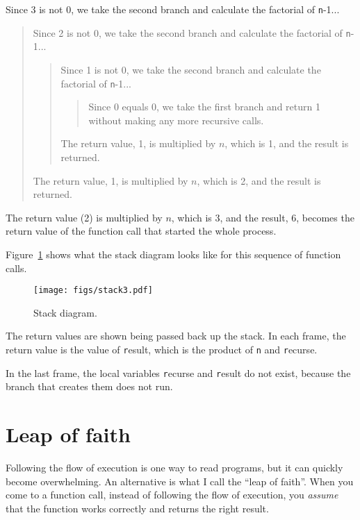\documentclass[
DIV=11,
fontsize=12,
twoside,
headinclude=false,
titlepage=firstiscover,
abstract=true,
headsepline=true,
footsepline=true,
chapterprefix=true, %
headings=big,
bibliography=totoc,%
captions=tableheading
]{scrbook}
\theoremstyle{definition}
\begin{document}
Since 3 is not 0, we take the second branch and calculate the factorial
of {\texttt n-1}...

\begin{quote}
Since 2 is not 0, we take the second branch and calculate the factorial of
{\texttt n-1}...


  \begin{quote}
  Since 1 is not 0, we take the second branch and calculate the factorial
  of {\texttt n-1}...


    \begin{quote}
    Since 0 equals 0, we take the first branch and return 1
    without making any more recursive calls.
    \end{quote}


  The return value, 1, is multiplied by $n$, which is 1, and the
  result is returned.
  \end{quote}


The return value, 1, is multiplied by $n$, which is 2, and the
result is returned.
\end{quote}


The return value (2) is multiplied by $n$, which is 3, and the result, 6,
becomes the return value of the function call that started the whole
process.

Figure~\ref{fig.stack3} shows what the stack diagram looks like for
this sequence of function calls.

\begin{figure}
\centerline
{\texttt{[image: figs/stack3.pdf]}}
\caption{Stack diagram.}
\label{fig.stack3}
\end{figure}

The return values are shown being passed back up the stack.  In each
frame, the return value is the value of {\texttt result}, which is the
product of {\texttt n} and {\texttt recurse}.

In the last frame, the local
variables {\texttt recurse} and {\texttt result} do not exist, because
the branch that creates them does not run.


\section{Leap of faith}

Following the flow of execution is one way to read programs, but
it can quickly become overwhelming.  An
alternative is what I call the ``leap of faith''.  When you come to a
function call, instead of following the flow of execution, you {\em
assume} that the function works correctly and returns the right
result.
\end{document}
